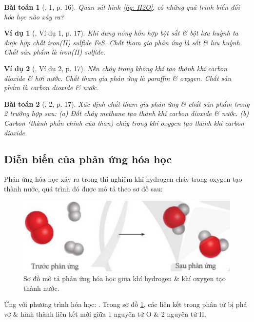 \documentclass{article}
\newtheorem{baitoan}{Bài toán}
\newtheorem{vidu}{Ví dụ}
\begin{document}
\begin{baitoan}[\cite{SGK_KHTN_8_Canh_Dieu}, 1, p. 16]
	Quan sát hình \ref{fig: H2O}, có những quá trình biến đổi hóa học nào xảy ra?
\end{baitoan}

\begin{vidu}[\cite{SGK_KHTN_8_Canh_Dieu}, Ví dụ 1, p. 17]
	Khi đung nóng hỗn hợp bột sắt \& bột lưu huỳnh ta được hợp chất iron(II) sulfide \emph{FeS}. Chất tham gia phản ứng là sắt \& lưu huỳnh. Chất sản phẩm là iron(II) sulfide.
\end{vidu}

\begin{vidu}[\cite{SGK_KHTN_8_Canh_Dieu}, Ví dụ 2, p. 17]
	Nến cháy trong không khí tạo thành khí carbon dioxide \& hơi nước. Chất tham gia phản ứng là paraffin \& oxygen. Chất sản phẩm là carbon dioxide \& nước.
\end{vidu}

\begin{baitoan}[\cite{SGK_KHTN_8_Canh_Dieu}, 2, p. 17]
	Xác định chất tham gia phản ứng \& chất sản phẩm trong 2 trường hợp sau: (a) Đốt cháy methane tạo thành khí carbon dioxide \& nước. (b) Carbon (thành phần chính của than) cháy trong khí oxygen tạo thành khí carbon dioxide.
\end{baitoan}

\subsection{Diễn biến của phản ứng hóa học}
Phản ứng hóa học xảy ra trong thí nghiệm khí hydrogen cháy trong oxygen tạo thành nước, quá trình đó được mô tả theo sơ đồ sau:
\begin{figure}[H]
	\centering
	\includegraphics[scale=0.3]{PUHH_H2O}
	\caption{Sơ đồ mô tả phản ứng hóa học giữa khí hydrogen \& khí oxygen tạo thành nước.}
	\label{fig: PUHH H2O}
\end{figure}
\noindent Ứng với phương trình hóa học: . Trong sơ đồ \ref{fig: PUHH H2O}, các liên kết trong phân tử  bị phá vỡ \& hình thành liên kết mới giữa 1 nguyên tử O \& 2 nguyên tử H.
\end{document}
